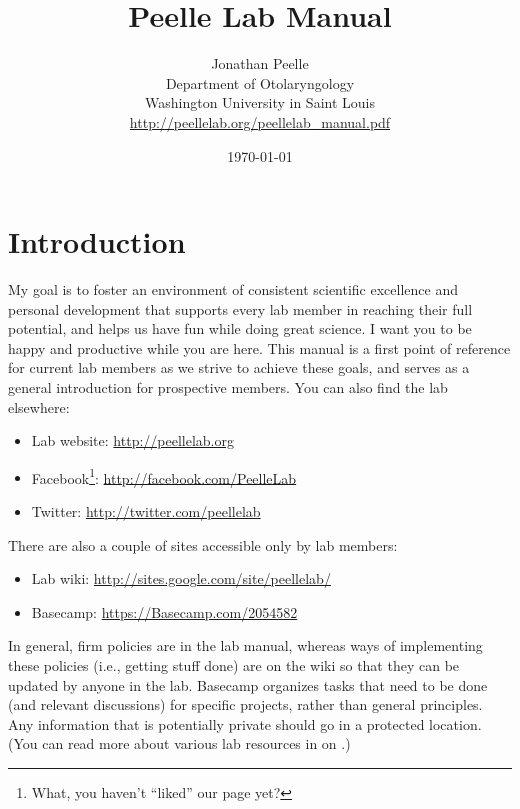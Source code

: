 \documentclass[letterpaper,12pt,oneside]{memoir}
\begin{document}
\title{Peelle Lab Manual}
\author{Jonathan Peelle\\Department of Otolaryngology\\Washington University in Saint Louis\\ \url{http://peellelab.org/peellelab_manual.pdf}}
\date{\today}

\maketitle

\pagestyle{titlingpage}

\cleardoublepage
\frontmatter
\tableofcontents
\cleardoublepage

\mainmatter

\pagestyle{headings}

\chapter{Introduction}

My goal is to foster an environment of consistent scientific excellence and personal development that supports every lab member in reaching their full potential, and helps us have fun while doing great science. I want you to be happy and productive while you are here. This manual is a first point of reference for current lab members as we strive to achieve these goals, and serves as a general introduction for prospective members. You can also find the lab elsewhere:

\begin{itemize}
\item Lab website: \url{http://peellelab.org}
\item Facebook\footnote{What, you haven't ``liked'' our page yet?}: \url{http://facebook.com/PeelleLab}
\item Twitter: \url{http://twitter.com/peellelab}
\end{itemize}

\noindent There are also a couple of sites accessible only by lab members:

\begin{itemize}
\item Lab wiki: \url{http://sites.google.com/site/peellelab/}
\item Basecamp: \url{https://Basecamp.com/2054582}
\end{itemize}

In general, firm policies are in the lab manual, whereas ways of implementing these policies (i.e., getting stuff done) are on the wiki so that they can be updated by anyone in the lab. Basecamp organizes tasks that need to be done (and relevant discussions) for specific projects, rather than general principles. Any information that is potentially private should go in a protected location. (You can read more about various lab resources in  on .)
\end{document}
